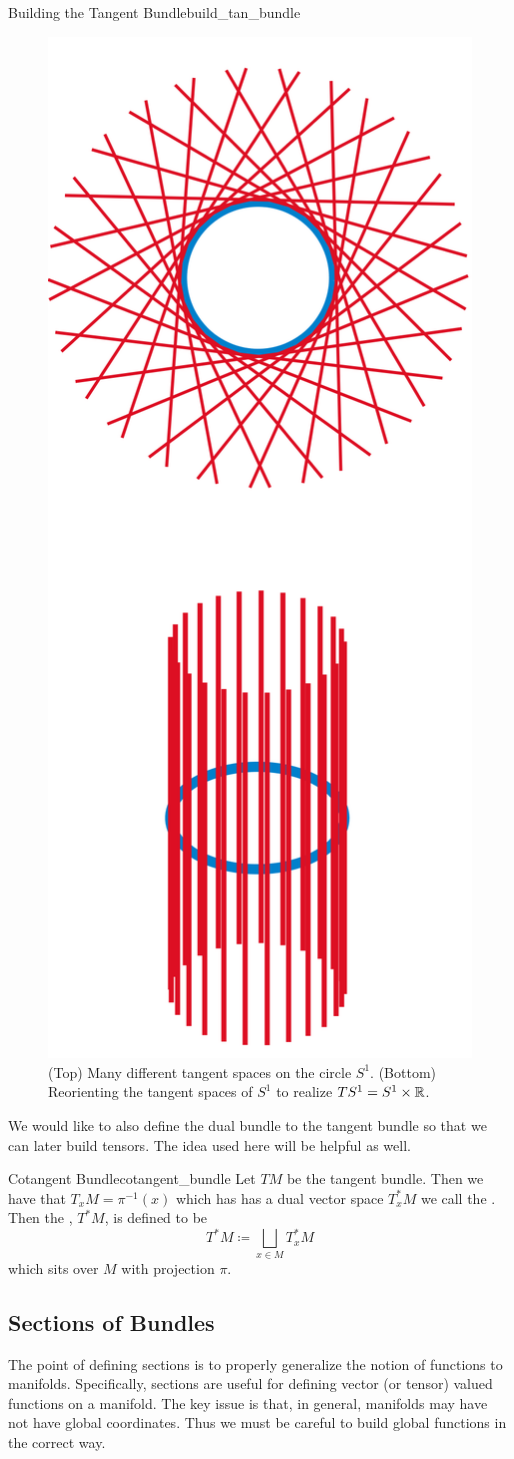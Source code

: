 \begin{fig}{Building the Tangent Bundle}{build_tan_bundle}
\begin{figure}[H]
    \centering
    \includegraphics[width=.3\textwidth]{TACA_2019/s^1_tangent_bundle.png}
    \caption{(Top) Many different tangent spaces on the circle $S^1$. (Bottom) Reorienting the tangent spaces of $S^1$ to realize $TS^1=S^1\times \mathbb{R}$.}
    \label{fig:tangent_bundle}
\end{figure}
\end{fig}

We would like to also define the dual bundle to the tangent bundle so that we can later build tensors.  The idea used here will be helpful as well.

\begin{df}{Cotangent Bundle}{cotangent_bundle}
Let $TM$ be the tangent bundle.  Then we have that $T_xM=\pi^{-1}(x)$ which has has a dual vector space $T_x^*M$ we call the .  Then the , $T^*M$, is defined to be
\[
T^*M \coloneqq \bigsqcup_{x\in M} T_x^*M
\]
which sits over $M$ with projection $\pi$. 
\end{df}

\subsection{Sections of Bundles}
The point of defining sections is to properly generalize the notion of functions to manifolds. Specifically, sections are useful for defining vector (or tensor) valued functions on a manifold. The key issue is that, in general, manifolds may have not have global coordinates.  Thus we must be careful to build global functions in the correct way.


